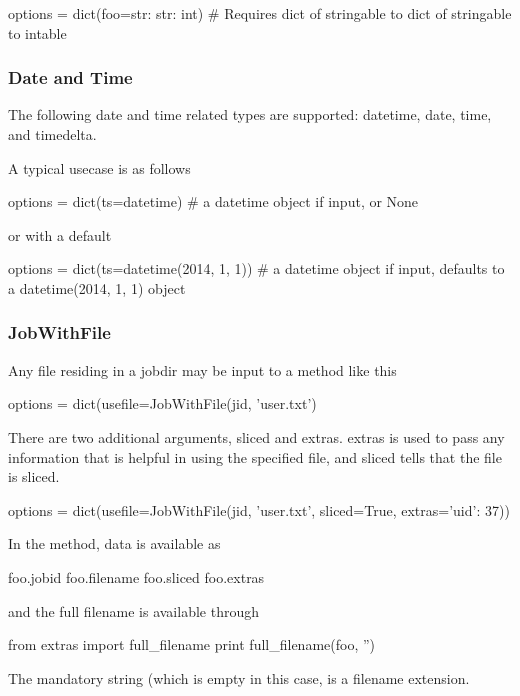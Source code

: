 \begin{python}
options = dict(foo={str: {str: int}})
# Requires dict of stringable to dict of stringable to intable
\end{python}



\subsubsection*{Date and Time}
The following date and time related types are supported:
datetime, date, time, and timedelta.

A typical usecase is as follows

\begin{python}
options = dict(ts=datetime)
# a datetime object if input, or None
\end{python}
or with a default

\begin{python}
options = dict(ts=datetime(2014, 1, 1))
#  a datetime object if input, defaults to a datetime(2014, 1, 1) object
\end{python}



\subsubsection*{JobWithFile}
Any file residing in a jobdir may be input to a method like this

\begin{python}
options = dict(usefile=JobWithFile(jid, 'user.txt')
\end{python}

There are two additional arguments, sliced and extras.  extras is used
to pass any information that is helpful in using the specified file,
and sliced tells that the file is sliced.

\begin{python}
options = dict(usefile=JobWithFile(jid, 'user.txt', sliced=True, extras={'uid': 37}))
\end{python}
In the method, data is available as

\begin{python}
  foo.jobid
  foo.filename
  foo.sliced
  foo.extras
\end{python}
and the full filename is available through

\begin{python}
from extras import full_filename
print full_filename(foo, '')
\end{python}
The mandatory string (which is empty in this case, is a filename
extension.







